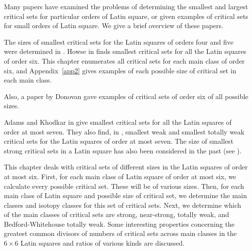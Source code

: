 \documentclass[12pt]{report}
\begin{document}
%
%


Many papers have examined the problems of determining the smallest and
largest critical sets for particular orders of Latin square, or given
examples of critical sets for small orders of Latin square.  We give a
brief overview of these papers.

The sizes of smallest critical sets for the Latin squares of orders
four and five were determined in \cite {MR95k:05030,MR80j:05022}.
Howse in \cite {MR98m:05026} finds smallest critical sets for all the
Latin squares of order six.  This chapter enumerates all critical
sets for each main class of order six, and Appendix~\ref{app2} gives examples of
each possible size of critical set in each main class.

Also, a paper \cite{MR99k:05038} by Donovan gave
examples of critical sets of order six of all possible sizes.

Adams and Khodkar in \cite{AK2} give smallest critical sets for all the
Latin squares of order at most seven. They also find, in \cite{MR2000k:05054},
smallest weak and smallest totally weak critical sets for the Latin
squares of order at most seven.  The size of smallest strong critical
sets in a Latin square has also been considered in the past (see \cite
{MR2000g:05034}).

This chapter deals with critical sets of different sizes in the Latin
squares of order at most six.  First, for each main class of Latin
square of order at most six, we calculate every possible critical set.
These will be of various sizes.  
Then, for each main class of
Latin square and possible size of critical set, we determine the main
classes and isotopy classes for this set of critical sets.  Next,
we determine which of the main classes of critical sets are strong,
near-strong, totally weak, and Bedford-Whitehouse
totally weak.  Some interesting properties concerning the greatest common
divisors of numbers of critical sets across main classes in the $6 \times
6$ Latin squares and ratios of various kinds are discussed.
\end{document}
